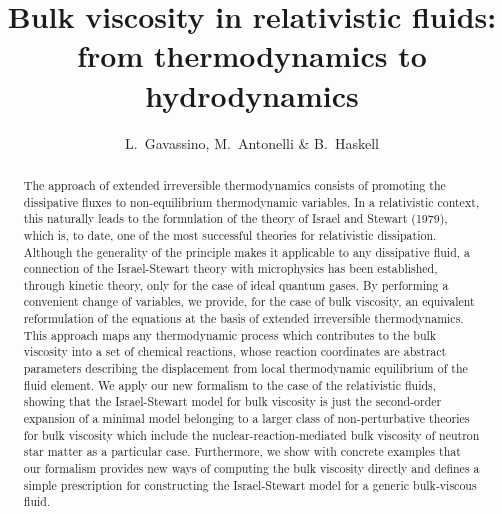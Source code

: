 \documentclass[useAMS,usenatbib,prd,twocolumn,nofootinbib]{revtex4-1}
\begin{document}
\title{Bulk viscosity in relativistic fluids: from thermodynamics to hydrodynamics}
\author{L.~Gavassino, M.~Antonelli \& B.~Haskell}


\begin{abstract}
The approach of extended irreversible thermodynamics consists of promoting the dissipative fluxes to non-equilibrium thermodynamic variables. In a relativistic context, this naturally leads to the formulation of the theory of Israel and Stewart (1979), which is, to date, one of the most successful theories for relativistic dissipation. Although the generality of the principle makes it applicable to any dissipative fluid, a connection of the Israel-Stewart theory with microphysics has been established, through kinetic theory, only for the case of ideal quantum gases. By performing a convenient change of variables, we provide, for the case of bulk viscosity, an equivalent reformulation of the equations at the basis of extended irreversible thermodynamics. This approach maps any thermodynamic process which contributes to the bulk viscosity into a set of chemical reactions, whose reaction coordinates are abstract parameters describing the displacement from local thermodynamic equilibrium of the fluid element. We apply our new formalism to the case of the relativistic fluids, showing that the Israel-Stewart model for bulk viscosity is just the second-order expansion of a minimal model belonging to a larger class of non-perturbative theories for bulk viscosity which include the nuclear-reaction-mediated bulk viscosity of neutron star matter as a particular case. Furthermore, we show with concrete examples that our formalism provides new ways of computing the bulk viscosity directly and defines a simple prescription for constructing the Israel-Stewart model for a generic bulk-viscous fluid.

\end{abstract}
\end{document}
